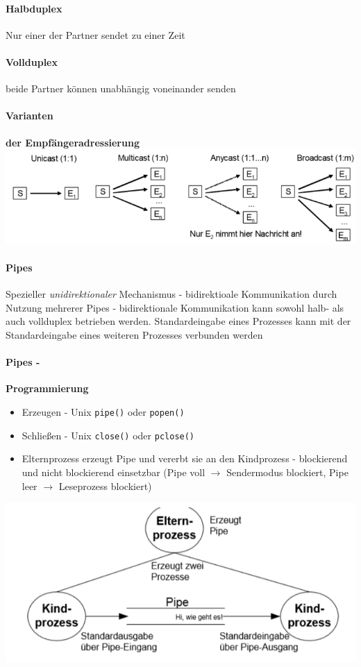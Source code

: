 \documentclass[10pt,a4paper,landscape]{article}
\begin{document}
\begin{multicols*}{3}
	\paragraph{Halbduplex} Nur einer der Partner sendet zu einer Zeit
	\paragraph{Vollduplex} beide Partner können unabhängig voneinander senden
	\paragraph{Varianten} \textbf{der Empfängeradressierung}\\
	\includegraphics[width=0.8\columnwidth]{adressierung}
	\paragraph{Pipes} Spezieller \textit{unidirektionaler} Mechanismus - bidirektioale Kommunikation durch Nutzung mehrerer Pipes - bidirektionale Kommunikation kann sowohl halb- als auch vollduplex betrieben werden. Standardeingabe eines Prozesses kann mit der Standardeingabe eines weiteren Prozesses verbunden werden
	\paragraph{Pipes -} \textbf{Programmierung}
	\begin{itemize}
		\item Erzeugen - Unix \texttt{pipe()} oder \texttt{popen()}
		\item Schließen - Unix \texttt{close()} oder \texttt{pclose()}
		\item Elternprozess erzeugt Pipe und vererbt sie an den Kindprozess - blockierend und nicht blockierend einsetzbar (Pipe voll $\rightarrow$ Sendermodus blockiert, Pipe leer $\rightarrow$ Leseprozess blockiert)
	\end{itemize}
	\includegraphics[width=0.65\columnwidth]{pipe}

\end{multicols*}
\end{document}
